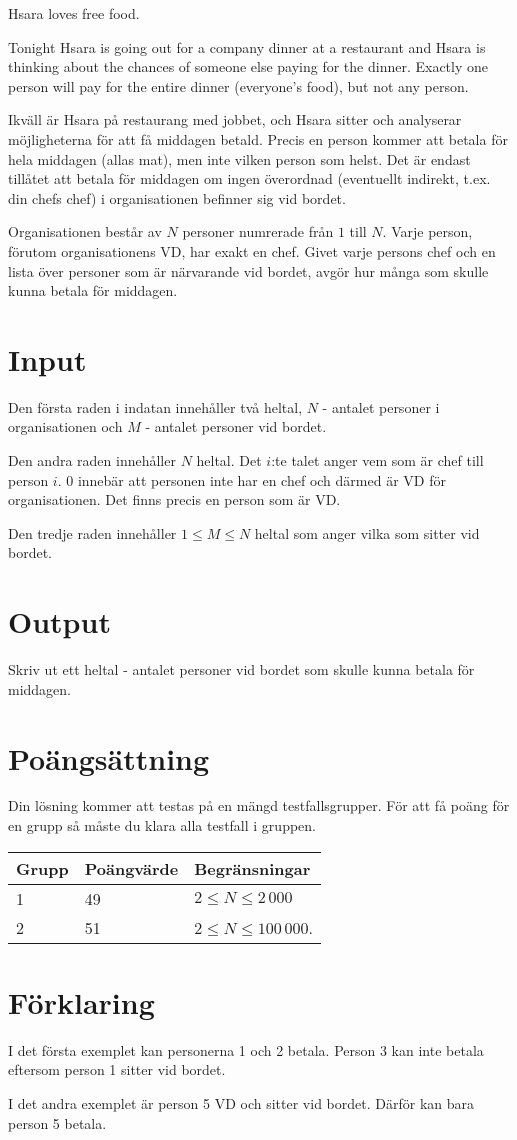 
Hsara loves free food.

Tonight Hsara is going out for a company dinner at a restaurant and Hsara is thinking about the chances of someone else paying for the dinner. Exactly one person will pay for the entire dinner (everyone's food), but not any person. 

Ikväll är Hsara på restaurang med jobbet, och Hsara sitter och analyserar möjligheterna för att få middagen betald. Precis en person kommer att betala för hela middagen (allas mat), men inte vilken person som helst. Det är endast tillåtet att betala för middagen om ingen överordnad (eventuellt indirekt, t.ex. din chefs chef) i organisationen befinner sig vid bordet.

Organisationen består av $N$ personer numrerade från $1$ till $N$. Varje person, förutom organisationens VD, har exakt en chef. Givet varje persons chef och en lista över personer som är närvarande vid bordet, avgör hur många som skulle kunna betala för middagen.

\section*{Input}

Den första raden i indatan innehåller två heltal, $N$ - antalet personer i organisationen och $M$ - antalet personer vid bordet.

Den andra raden innehåller $N$ heltal. Det $i$:te talet anger vem som är chef till person $i$. 0 innebär att personen inte har en chef och därmed är VD för organisationen. Det finns precis en person som är VD.

Den tredje raden innehåller $1 \le M \le N$ heltal som anger vilka som sitter vid bordet.

\section*{Output}
Skriv ut ett heltal - antalet personer vid bordet som skulle kunna betala för middagen.

\section*{Poängsättning}
Din lösning kommer att testas på en mängd testfallsgrupper. För att få poäng för en grupp så måste du klara alla testfall i gruppen.

\begin{tabular}{| l | l | l |}
	\hline
	Grupp & Poängvärde & Begränsningar\\ \hline
  1     & 49         & $2 \le N \le 2\,000$ \\ \hline
  2     & 51         & $2 \le N \le 100\,000$. \\ \hline
\end{tabular}

\section*{Förklaring}
I det första exemplet kan personerna 1 och 2 betala. Person 3 kan inte betala eftersom person 1 sitter vid bordet.

I det andra exemplet är person 5 VD och sitter vid bordet. Därför kan bara person 5 betala.
